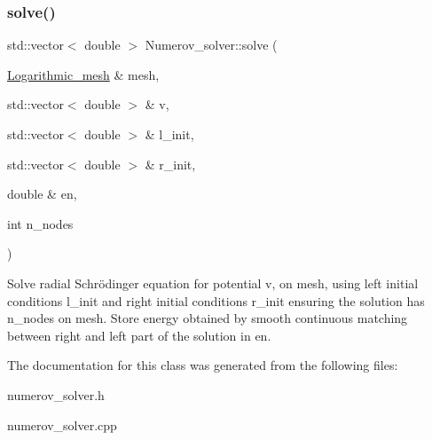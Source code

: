 \subsubsection{\texorpdfstring{solve()}{solve()}}
{\footnotesize\ttfamily std\+::vector$<$ double $>$ Numerov\+\_\+solver\+::solve (\begin{DoxyParamCaption}\item[{\hyperlink{classLogarithmic__mesh}{Logarithmic\+\_\+mesh} \&}]{mesh,  }\item[{std\+::vector$<$ double $>$ \&}]{v,  }\item[{std\+::vector$<$ double $>$ \&}]{l\+\_\+init,  }\item[{std\+::vector$<$ double $>$ \&}]{r\+\_\+init,  }\item[{double \&}]{en,  }\item[{int}]{n\+\_\+nodes }\end{DoxyParamCaption})}

Solve radial Schrödinger equation for potential v, on mesh, using left initial conditions l\+\_\+init and right initial conditions r\+\_\+init ensuring the solution has n\+\_\+nodes on mesh. Store energy obtained by smooth continuous matching between right and left part of the solution in en. 

The documentation for this class was generated from the following files\+:\begin{DoxyCompactItemize}
\item 
numerov\+\_\+solver.\+h\item 
numerov\+\_\+solver.\+cpp\end{DoxyCompactItemize}
